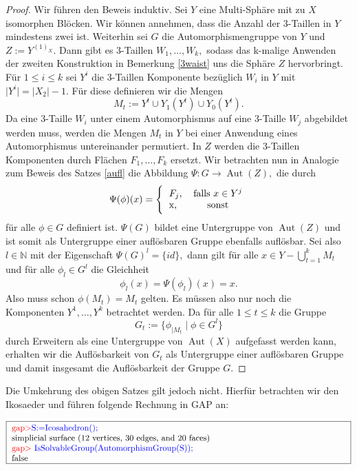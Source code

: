 \documentclass[12pt,titlepage,twoside,cleardoublepage]{article}
\theoremstyle{nummermitklammern}
\numberwithin{equation}{section}
\DeclareMathOperator{\Aut}{Aut}
\begin{document}
\begin{proof}
Wir führen den Beweis induktiv. Sei $Y$ eine Multi-Sphäre mit zu $X$ isomorphen Blöcken. Wir können annehmen, dass die Anzahl der 3-Taillen in $Y$ mindestens zwei ist. Weiterhin sei $G$ die Automorphismengruppe von $Y$ und $Z:=Y^{(1)_X}.$ Dann gibt es 3-Taillen $W_1,\ldots,W_k,$ sodass das k-malige Anwenden der zweiten Konstruktion in Bemerkung \ref{3waist} uns die Sphäre $Z$ hervorbringt.
 Für $1\leq i \leq k$ sei $Y^i$ die 3-Taillen Komponente bezüglich $W_i$ in $Y$ mit $\vert Y^i\vert =\vert X_2\vert -1.$ Für diese definieren wir die Mengen 
\[
M_t:=Y^t\cup Y_1(Y^t)\cup Y_0(Y^t).
\] Da eine 3-Taille $W_i$ unter einem Automorphismus auf eine  3-Taille $W_j$ abgebildet werden muss, werden die Mengen $M_t$ in $Y$ bei einer Anwendung eines Automorphismus untereinander permutiert. In $Z$ werden die 3-Taillen Komponenten durch Flächen $F_1,\ldots,F_k$ ersetzt.
Wir betrachten nun in Analogie zum Beweis des Satzes \ref{aufl} die Abbildung $\Psi:G\to \Aut(Z),$ die durch
\[
\Psi(\phi)(x)=\Biggl\{
\begin{tabular}[l]{lcr}
$F_j$,&\textcolor{black}{ falls  $x\in Y^j$} \\
x,& sonst\\
\end{tabular}
\]
für alle $\phi\in G$ definiert ist.
$\Psi(G)$ bildet eine Untergruppe von $\Aut(Z)$ und ist somit als Untergruppe einer auflösbaren Gruppe ebenfalls auflösbar. Sei also $l\in \mathbb{N}$ mit der Eigenschaft $\Psi(G)^l=\{id\},$ dann gilt für alle $x\in Y-\bigcup_{t=1}^kM_t$ und für alle $\phi_l \in G^l$ die Gleichheit
\[
\phi_l(x)=\Psi(\phi_l)(x)=x.
\]
Also muss schon $\phi(M_t)=M_t$ gelten. Es müssen also nur noch die Komponenten $Y^1,\ldots,Y^k$ betrachtet werden. Da für alle $1\leq t\leq k$ die Gruppe 
\[
G_t:=\{\phi_{\mid M_t}\mid \phi\in G^l\}
\]
durch Erweitern als eine Untergruppe von $\Aut(X)$ aufgefasst werden kann, erhalten wir die Auflösbarkeit von $G_t$ als Untergruppe einer auflösbaren Gruppe und damit insgesamt die Auflösbarkeit der Gruppe $G.$
 \end{proof}
Die Umkehrung des obigen Satzes gilt jedoch nicht. Hierfür betrachten wir den Ikosaeder und führen folgende Rechnung in GAP an:
\begin{center}
$\fbox{
\parbox{14cm}{
\textcolor{red}{gap$>$}\textcolor{blue}{ S:=Icosahedron();}\newline
simplicial surface (12 vertices, 30 edges, and 20 faces)\newline
\textcolor{red}{gap$>$} \textcolor{blue}{IsSolvableGroup(AutomorphismGroup(S));}\newline
false
}}$
\end{center}
\end{document}
